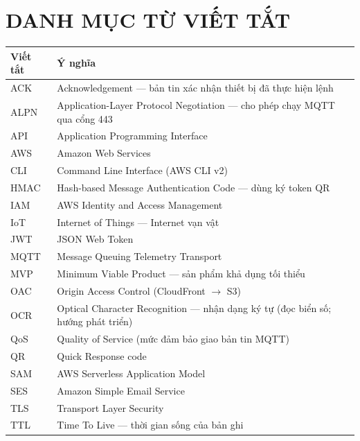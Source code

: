 \chapter*{DANH MỤC TỪ VIẾT TẮT}
\begin{longtable}{@{}P{3cm}P{11.5cm}@{}}
\toprule
\textbf{Viết tắt} & \textbf{Ý nghĩa} \\ \midrule
\endhead
ACK & Acknowledgement --- bản tin xác nhận thiết bị đã thực hiện lệnh \\
ALPN & Application-Layer Protocol Negotiation --- cho phép chạy MQTT qua cổng 443 \\
API & Application Programming Interface \\
AWS & Amazon Web Services \\
CLI & Command Line Interface (AWS CLI v2) \\
HMAC & Hash-based Message Authentication Code --- dùng ký token QR \\
IAM & AWS Identity and Access Management \\
IoT & Internet of Things --- Internet vạn vật \\
JWT & JSON Web Token \\
MQTT & Message Queuing Telemetry Transport \\
MVP & Minimum Viable Product --- sản phẩm khả dụng tối thiểu \\
OAC & Origin Access Control (CloudFront $\rightarrow$ S3) \\
OCR & Optical Character Recognition --- nhận dạng ký tự (đọc biển số; hướng phát triển) \\
QoS & Quality of Service (mức đảm bảo giao bản tin MQTT) \\
QR & Quick Response code \\
SAM & AWS Serverless Application Model \\
SES & Amazon Simple Email Service \\
TLS & Transport Layer Security \\
TTL & Time To Live --- thời gian sống của bản ghi \\
\bottomrule
\end{longtable}
